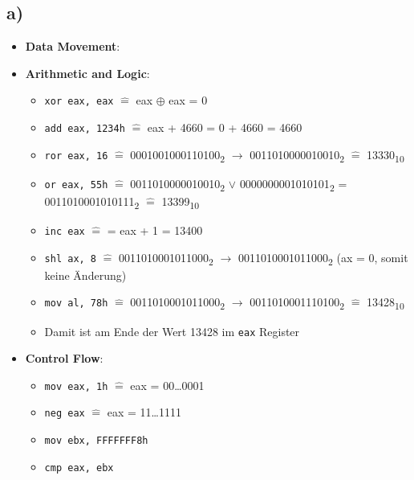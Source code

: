 \documentclass[]{article}
\begin{document}
\subsection*{a)}
\begin{itemize}
	\item \textbf{Data Movement}:
	
	\item  \textbf{Arithmetic and Logic}:
	\begin{itemize}
		\item \texttt{xor eax, eax} $\hat{=}$ eax $\oplus$ eax = 0
		\item \texttt{add eax, 1234h} $\hat{=}$ eax + 4660 = 0 + 4660 = 4660
		\item \texttt{ror eax, 16} $\hat{=}$ {0001001000110100}\textsubscript{2} $\rightarrow$ {0011010000010010}\textsubscript{2} $\hat{=}$  {13330}\textsubscript{10}
		\item \texttt{or eax, 55h} $\hat{=}$ {0011010000010010}\textsubscript{2} $\vee$ {0000000001010101}\textsubscript{2} = {0011010001010111}\textsubscript{2} $\hat{=}$ {13399}\textsubscript{10}
		\item \texttt{inc eax} $\hat{=}$ = eax + 1 = 13400
		\item \texttt{shl ax, 8} $\hat{=}$ 0011010001011000\textsubscript{2} $\rightarrow$ 0011010001011000\textsubscript{2} (ax = 0, somit keine Änderung)
		\item  \texttt{mov al, 78h} $\hat{=}$ 0011010001011000\textsubscript{2} $\rightarrow$ 0011010001110100\textsubscript{2} $\hat{=}$ 13428\textsubscript{10}
		\item Damit ist am Ende der Wert 13428 im \texttt{eax} Register
	\end{itemize}
	
	\item \textbf{Control Flow}:
	\begin{itemize}
		\item \texttt{mov eax, 1h} $\hat{=}$ eax = 00\dots0001
		\item \texttt{neg eax} $\hat{=}$ eax = 11\dots1111
		\item \texttt{mov ebx, FFFFFFF8h}
		\item \texttt{cmp eax, ebx} 
	\end{itemize}
\end{itemize}
\end{document}

